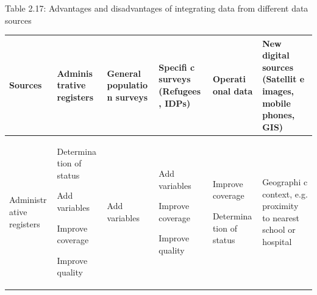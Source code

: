\documentclass[
]{article}
\begin{document}
Table 2.17: Advantages and disadvantages of integrating data from
different data sources

\begin{longtable}[]{@{}llllll@{}}
\toprule
\begin{minipage}[b]{0.14\columnwidth}\raggedright
\textbf{Sources
}\strut
\end{minipage} & \begin{minipage}[b]{0.14\columnwidth}\raggedright
\textbf{Adminis
trative
registers
}\strut
\end{minipage} & \begin{minipage}[b]{0.14\columnwidth}\raggedright
\textbf{General
populatio
n
surveys}\strut
\end{minipage} & \begin{minipage}[b]{0.14\columnwidth}\raggedright
\textbf{Specifi
c
surveys
(Refugees
,
IDPs)}\strut
\end{minipage} & \begin{minipage}[b]{0.14\columnwidth}\raggedright
\textbf{Operati
onal
data}\strut
\end{minipage} & \begin{minipage}[b]{0.14\columnwidth}\raggedright
\textbf{New
digital
sources
(Satellit
e
images,
mobile
phones,
GIS)}\strut
\end{minipage}\tabularnewline
\midrule
\endhead
\begin{minipage}[t]{0.14\columnwidth}\raggedright
Administr
ative
registers\strut
\end{minipage} & \begin{minipage}[t]{0.14\columnwidth}\raggedright
Determina
tion
of status

Add
variables

Improve
coverage

Improve
quality\strut
\end{minipage} & \begin{minipage}[t]{0.14\columnwidth}\raggedright
Add
variables\strut
\end{minipage} & \begin{minipage}[t]{0.14\columnwidth}\raggedright
Add
variables

Improve
coverage

Improve
quality\strut
\end{minipage} & \begin{minipage}[t]{0.14\columnwidth}\raggedright
Improve
coverage

Determina
tion
of status\strut
\end{minipage} & \begin{minipage}[t]{0.14\columnwidth}\raggedright
Geographi
c
context,
e.g.
proximity
to
nearest
school or
hospital


\end{minipage}
\end{longtable}
\end{document}
